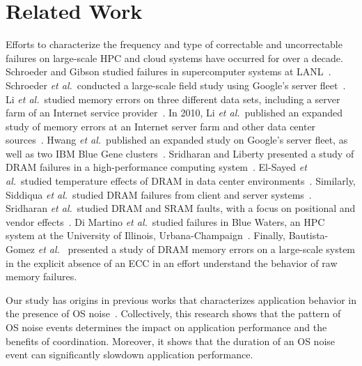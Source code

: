 
\section{Related Work}
\label{sec:related}

Efforts to characterize the frequency and type of correctable and uncorrectable
failures on large-scale HPC and cloud systems have occurred for over a decade.
Schroeder and Gibson studied failures in supercomputer systems at
LANL~\cite{Schroeder:2006:Large-scale}.  Schroeder {\it et al.}~conducted a
large-scale field study using Google's server fleet~\cite{Schroeder09}.  Li {\it
et al.}~studied memory errors on three different data sets, including a server
farm of an Internet service provider~\cite{Li07}.  In 2010, Li {\it et
al.}~published an expanded study of memory errors at an Internet server farm and
other data center sources~\cite{Li10}.  Hwang {\it et al.}~published an expanded
study on Google's server fleet, as well as two IBM Blue Gene
clusters~\cite{Hwang12}.  Sridharan and Liberty presented a study of DRAM
failures in a high-performance computing system~\cite{Sridharan12}.  El-Sayed
{\it et al.}~studied temperature effects of DRAM in data center
environments~\cite{Elsayed12}.  Similarly, Siddiqua {\it et al.}~studied DRAM
failures from client and server systems~\cite{Siddiqua13}.  Sridharan {\it et
al.}~studied DRAM and SRAM faults, with a focus on positional and vendor
effects~\cite{Sridharan13}.  Di Martino {\it et al.}~studied failures in Blue
Waters, an HPC system at the University of Illinois,
Urbana-Champaign~\cite{bluewaters}.  Finally, Bautista-Gomez {\it et
al.}~\cite{Bautista-Gomez:2016:Unprotected} presented a study of DRAM memory
errors on a large-scale system in the explicit absence of an ECC in an effort
understand the behavior of raw memory failures.


Our study has origins in previous works that characterizes application behavior
in the presence of OS
noise~\cite{Ferreira:2008:Characterizing,Hoefler:2010:Characterizing}.
Collectively, this research shows that the pattern of OS noise events determines
the impact on application performance and the benefits of coordination.
Moreover, it shows that the duration of an OS noise event can significantly
slowdown application performance.

